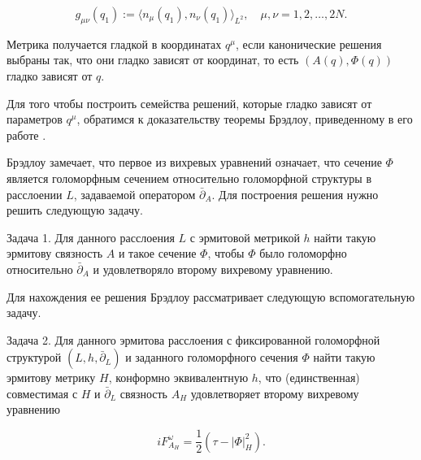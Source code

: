 $$

g_{\mu\nu}(q_1):=\langle n_\mu(q_1),n_\nu(q_1)\rangle_{L^2},\quad\mu,\nu=1, 2,\dots, 2N. 

$$ 



Метрика получается гладкой в координатах $q^\mu$, если канонические решения выбраны так, что они  гладко зависят от координат, то есть $(A(q),\Phi(q))$ гладко зависят от $q$.



Для того чтобы построить семейства решений, которые гладко зависят от параметров $q^{\mu}$, обратимся к доказательству теоремы Брэдлоу, приведенному в его работе \cite{palv:bradlow}. 

Брэдлоу замечает, что первое из вихревых уравнений означает, что сечение $\Phi$ является голоморфным сечением относительно голоморфной структуры в расслоении $L$, задаваемой оператором $\bar\partial_A$. Для построения решения нужно решить следующую задачу.



\smallskip



\hypertarget{plv:1}{}



{\small \sc Задача 1.} Для данного расслоения $L$ с эрмитовой метрикой $h$ найти такую эрмитову связность $A$ и такое сечение $\Phi$, чтобы $\Phi$ было голоморфно относительно $\bar\partial_A$ и удовлетворяло второму вихревому уравнению.



\smallskip

Для нахождения ее решения Брэдлоу рассматривает следующую вспомогательную задачу.



\smallskip



\hypertarget{plv:2}{}



{\small \sc Задача 2.} Для данного эрмитова расслоения с фиксированной голоморфной структурой $(L,h,\bar\partial_L)$ и заданного голоморфного сечения $\Phi$ найти такую эрмитову метрику $H$, конформно эквивалентную $h$, что (единственная) совместимая с $H$ и $\bar\partial_L$ связность $A_H$ удовлетворяет второму вихревому уравнению 

\begin{equation}

\label{secondvortexeq}

iF_{A_H}^\omega=\dfrac12(\tau-|\Phi|_{H}^2).

\end{equation}



